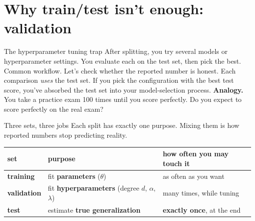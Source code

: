 \documentclass[aspectratio=169]{beamer}
\begin{document}
\section{Why train/test isn't enough: validation}

\begin{frame}{The hyperparameter tuning trap}
  After splitting, you try several models or hyperparameter settings. You evaluate each on the test set, then pick the best.
  \vfill
  Common workflow. Let's check whether the reported number is honest.
  \vfill
  Each comparison \emph{uses} the test set. If you pick the configuration with the best test score, you've absorbed the test set into your model-selection process.
  \vfill
  \textbf{Analogy.} You take a practice exam 100 times until you score perfectly. Do you expect to score perfectly on the real exam?
\end{frame}

\begin{frame}{Three sets, three jobs}
  Each split has exactly one purpose. Mixing them is how reported numbers stop predicting reality.
  \vfill
  \begin{center}
  \end{center}
  \vfill
  \begin{center}\small
    \renewcommand{\arraystretch}{1.5}
    \begin{tabular}{l l l}
      \textbf{set} & \textbf{purpose} & \textbf{how often you may touch it} \\
      \hline
      \textcolor{armblue}{\textbf{training}}    & fit \textbf{parameters} ($\theta$)         & as often as you want \\
      \textcolor{armorange!80!black}{\textbf{validation}}  & fit \textbf{hyperparameters} (degree $d$, $\alpha$, $\lambda$) & many times, while tuning \\
      \textcolor{armred}{\textbf{test}}         & estimate \textbf{true generalization}      & \textbf{exactly once}, at the end \\
      \hline
    \end{tabular}
  \end{center}
  \vfill
\end{frame}
\end{document}
